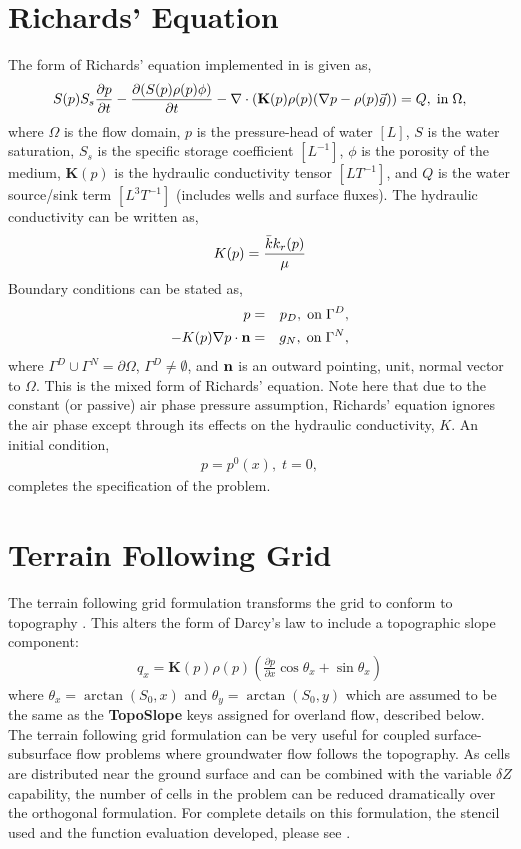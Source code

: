 \section{Richards' Equation}
\label{Richards' Equation}

The form of Richards' equation implemented in \parflow{} is given as,
\begin{eqnarray}
S(p)S_s\frac{\partial p}{\partial t} -
\frac{\partial (S(p)\rho(p)\phi)}{\partial t} 
- \nabla \cdot (\textbf{K}(p)\rho(p)(\nabla p - \rho(p) {\vec g})) = Q, \;  {\rm in} \; \Omega, 
\label{eq:richard}
\end{eqnarray}
where $\Omega$ is the flow domain, $p$ is the pressure-head of water $[L]$, $S$ is the water
saturation, $S_s$ is the specific storage coefficient $[L^{-1}]$, $\phi$ is the porosity of the medium, $\textbf{K}(p)$ is the hydraulic
conductivity tensor $[LT^{-1}]$, and $Q$ is the water source/sink term $[L^{3}T^{-1}]$ (includes wells and surface fluxes).
The hydraulic conductivity can be written as,
\begin{eqnarray}
K(p) =  \frac{{\bar k} k_r(p)}{\mu}
\end{eqnarray}
Boundary conditions can be stated as,
\begin{eqnarray}
p & = & p_D, \; {\rm on} \; \Gamma^D, \label{eq:bcd} \\
-K(p)\nabla p \cdot {\bf n} & = & 
g_N, \; {\rm on} \; \Gamma^N, \label{eq:bcn}
\end{eqnarray}
where $\Gamma^D \cup \Gamma^N = \partial \Omega$, $\Gamma^D \neq \emptyset$,
and ${\bf n}$ is an outward pointing, unit, normal vector to $\Omega$.
This is the mixed form of Richards' equation. 
Note here that due to the constant (or passive) air phase pressure assumption,
Richards' equation ignores the air phase except through its
effects on the hydraulic conductivity, $K$.  
An initial condition,
\begin{eqnarray}
p = p^0(x), \; t = 0,
\end{eqnarray}
completes the specification of the problem.
\section{Terrain Following Grid}
\label{TFG}
The terrain following grid formulation transforms the \parflow{} grid to conform to topography \cite{M13}. This alters the form of Darcy's law to include a topographic slope component:
\begin{eqnarray}
q_x=\textbf{K}(p)\rho(p)(\frac{\partial p}{\partial x}\cos \theta_x + \sin \theta_x) 
\label{eq:darcyTFG}
\end{eqnarray}
where $\theta_x = \arctan(S_0,x)$ and $\theta_y = \arctan(S_0,y)$ which are assumed to be the same as the {\bf TopoSlope} keys assigned for overland flow, described below.  The terrain following grid formulation can be very useful for coupled surface-subsurface flow problems where groundwater flow follows the topography.  As cells are distributed near the ground surface and can be combined with the variable $\delta Z$ capability, the number of cells in the problem can be reduced dramatically over the orthogonal formulation. For complete details on this formulation, the stencil used and the function evaluation developed, please see \cite{M13}.
